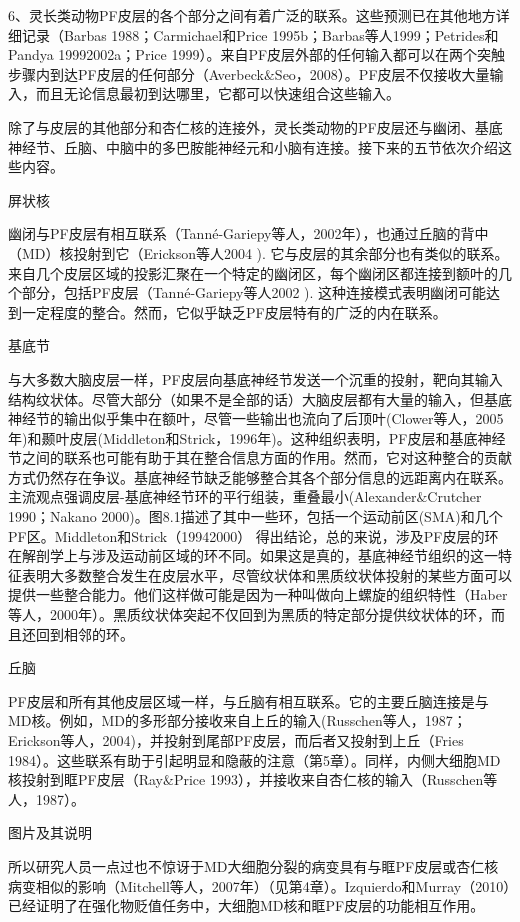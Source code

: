6、灵长类动物PF皮层的各个部分之间有着广泛的联系。这些预测已在其他地方详细记录（Barbas 1988；Carmichael和Price 1995b；Barbas等人1999；Petrides和Pandya 19992002a；Price 1999）。来自PF皮层外部的任何输入都可以在两个突触步骤内到达PF皮层的任何部分（Averbeck$\&$Seo，2008）。PF皮层不仅接收大量输入，而且无论信息最初到达哪里，它都可以快速组合这些输入。

除了与皮层的其他部分和杏仁核的连接外，灵长类动物的PF皮层还与幽闭、基底神经节、丘脑、中脑中的多巴胺能神经元和小脑有连接。接下来的五节依次介绍这些内容。

屏状核

幽闭与PF皮层有相互联系（Tanné-Gariepy等人，2002年），也通过丘脑的背中（MD）核投射到它（Erickson等人2004 ). 它与皮层的其余部分也有类似的联系。来自几个皮层区域的投影汇聚在一个特定的幽闭区，每个幽闭区都连接到额叶的几个部分，包括PF皮层（Tanné-Gariepy等人2002 ). 这种连接模式表明幽闭可能达到一定程度的整合。然而，它似乎缺乏PF皮层特有的广泛的内在联系。

基底节

与大多数大脑皮层一样，PF皮层向基底神经节发送一个沉重的投射，靶向其输入结构纹状体。尽管大部分（如果不是全部的话）大脑皮层都有大量的输入，但基底神经节的输出似乎集中在额叶，尽管一些输出也流向了后顶叶(Clower等人，2005年)和颞叶皮层(Middleton和Strick，1996年)。这种组织表明，PF皮层和基底神经节之间的联系也可能有助于其在整合信息方面的作用。然而，它对这种整合的贡献方式仍然存在争议。基底神经节缺乏能够整合其各个部分信息的远距离内在联系。主流观点强调皮层-基底神经节环的平行组装，重叠最小(Alexander$\&$Crutcher 1990；Nakano 2000)。图8.1描述了其中一些环，包括一个运动前区(SMA)和几个PF区。Middleton和Strick（19942000） 得出结论，总的来说，涉及PF皮层的环在解剖学上与涉及运动前区域的环不同。如果这是真的，基底神经节组织的这一特征表明大多数整合发生在皮层水平，尽管纹状体和黑质纹状体投射的某些方面可以提供一些整合能力。他们这样做可能是因为一种叫做向上螺旋的组织特性（Haber等人，2000年）。黑质纹状体突起不仅回到为黑质的特定部分提供纹状体的环，而且还回到相邻的环。

丘脑

PF皮层和所有其他皮层区域一样，与丘脑有相互联系。它的主要丘脑连接是与MD核。例如，MD的多形部分接收来自上丘的输入(Russchen等人，1987；Erickson等人，2004)，并投射到尾部PF皮层，而后者又投射到上丘（Fries 1984）。这些联系有助于引起明显和隐蔽的注意（第5章）。同样，内侧大细胞MD核投射到眶PF皮层（Ray$\&$Price 1993），并接收来自杏仁核的输入（Russchen等人，1987）。

图片及其说明

所以研究人员一点过也不惊讶于MD大细胞分裂的病变具有与眶PF皮层或杏仁核病变相似的影响（Mitchell等人，2007年）（见第4章）。Izquierdo和Murray（2010）已经证明了在强化物贬值任务中，大细胞MD核和眶PF皮层的功能相互作用。

